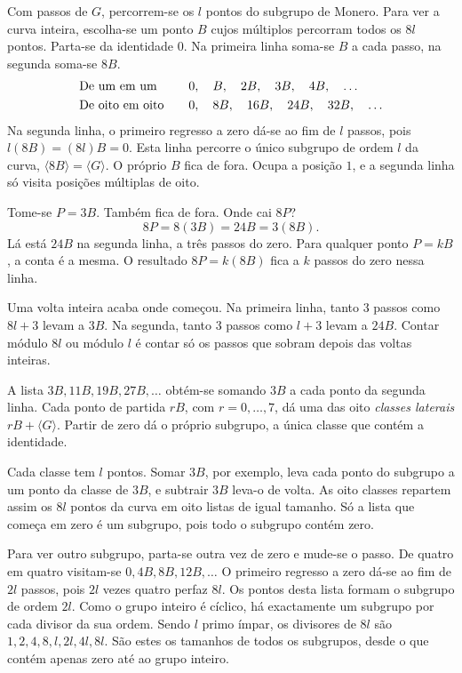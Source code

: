Com passos de \(G\), percorrem-se os \(l\) pontos do subgrupo de Monero.
Para ver a curva inteira, escolha-se um ponto \(B\) cujos múltiplos percorram
todos os \(8l\) pontos. Parta-se da identidade \(0\). Na primeira linha soma-se
\(B\) a cada passo, na segunda soma-se \(8B\).
\[
  \begin{array}{@{}l@{\qquad}l@{}}
    \text{De um em um}     & 0,\quad B,\quad 2B,\quad 3B,\quad 4B,\quad\ldots \\[3pt]
    \text{De oito em oito} & 0,\quad 8B,\quad 16B,\quad 24B,\quad 32B,\quad\ldots
  \end{array}
\]
Na segunda linha, o primeiro regresso a zero dá-se ao fim de \(l\) passos,
pois \(l(8B)=(8l)B=0\). Esta linha percorre o único subgrupo de ordem \(l\) da curva,
\(\langle 8B\rangle=\langle G\rangle\). O próprio \(B\) fica de fora.
Ocupa a posição \(1\), e a segunda linha só visita posições múltiplas de oito.

Tome-se \(P=3B\). Também fica de fora. Onde cai \(8P\)?
\[
  8P=8(3B)=24B=3(8B).
\]
Lá está \(24B\) na segunda linha, a três passos do zero. Para qualquer ponto
\(P=kB\), a conta é a mesma. O resultado \(8P=k(8B)\) fica a \(k\) passos do zero nessa linha.

Uma volta inteira acaba onde começou. Na primeira linha, tanto \(3\) passos como
\(8l+3\) levam a \(3B\). Na segunda, tanto \(3\) passos como \(l+3\) levam a \(24B\).
Contar módulo \(8l\) ou módulo \(l\) é contar só os passos que sobram depois das voltas inteiras.

A lista \(3B,11B,19B,27B,\ldots\) obtém-se somando \(3B\) a cada ponto da segunda linha.
Cada ponto de partida \(rB\), com \(r=0,\ldots,7\),
dá uma das oito \emph{classes laterais} \(rB+\langle G\rangle\).
Partir de zero dá o próprio subgrupo, a única classe que contém a identidade.

Cada classe tem \(l\) pontos. Somar \(3B\), por exemplo, leva cada ponto do
subgrupo a um ponto da classe de \(3B\), e subtrair \(3B\) leva-o de volta.
As oito classes repartem assim os \(8l\) pontos da curva em oito listas de
igual tamanho. Só a lista que começa em zero é um subgrupo, pois todo o
subgrupo contém zero.

Para ver outro subgrupo, parta-se outra vez de zero e mude-se o passo.
De quatro em quatro visitam-se \(0,4B,8B,12B,\ldots\) O primeiro regresso
a zero dá-se ao fim de \(2l\) passos, pois \(2l\) vezes quatro perfaz \(8l\).
Os pontos desta lista formam o subgrupo de ordem \(2l\).
Como o grupo inteiro é cíclico, há exactamente um subgrupo por cada divisor
da sua ordem. Sendo \(l\) primo ímpar, os divisores de \(8l\) são
\(1,2,4,8,l,2l,4l,8l\). São estes os tamanhos de todos os subgrupos,
desde o que contém apenas zero até ao grupo inteiro.

